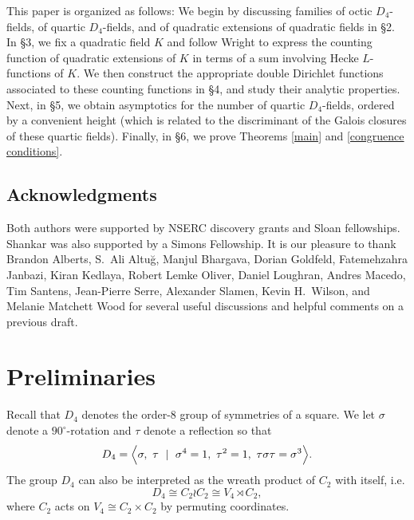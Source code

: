 \documentclass[10pt]{article}
\theoremstyle{plain}
\theoremstyle{definition}
\theoremstyle{remark}
\newcommand{\rotation}{\sigma}
\newcommand{\reflection}{\tau}
\begin{document}
\medskip

This paper is organized as follows: We begin by discussing families of
octic $D_4$-fields, of quartic $D_4$-fields, and of quadratic
extensions of quadratic fields in \S2. In \S3, we fix a quadratic
field $K$ and follow Wright \cite{MR969545} to express the counting
function of quadratic extensions of $K$ in terms of a sum involving
Hecke $L$-functions of $K$. We then construct the appropriate double
Dirichlet functions associated to these counting functions in \S4, and
study their analytic properties. Next, in \S5, we obtain  asymptotics for the number of quartic $D_4$-fields, ordered by a convenient height (which is related to the discriminant of the Galois closures of these quartic fields). Finally,
in \S6, we prove Theorems \ref{main} and \ref{congruence conditions}.



\subsection*{Acknowledgments}
\noindent Both authors were supported by NSERC discovery grants and Sloan fellowships. Shankar was also supported
by a Simons Fellowship. It is our pleasure to thank Brandon Alberts, S.~Ali Altu\u{g}, Manjul Bhargava, Dorian Goldfeld, Fatemehzahra Janbazi, Kiran Kedlaya, Robert Lemke Oliver, Daniel Loughran, Andres Macedo, Tim Santens, Jean-Pierre Serre, Alexander Slamen, Kevin H.~Wilson, and Melanie Matchett Wood for several useful discussions and helpful comments on a previous draft.







\section{Preliminaries}


Recall that $D_4$ denotes the order-8 group of symmetries of a
square. We let $\rotation$ denote a $90^\circ$-rotation
and $\reflection$ denote a reflection so that
\begin{equation*} D_4 =
\Bigl\langle \rotation ,\ \reflection \ \mid \ \rotation^4 =
1,\ \reflection^2 = 1, \ \reflection\rotation\reflection =
\rotation^3 \Bigr\rangle. \end{equation*} 
The group $D_4$ can also be interpreted as the wreath product of $C_2$
with itself, i.e.
	$$D_4 \cong C_2 \wr C_2 \cong V_4 \rtimes C_2,$$ where $C_2$
acts on $V_4 \cong C_2 \times C_2$ by permuting coordinates.
\end{document}
